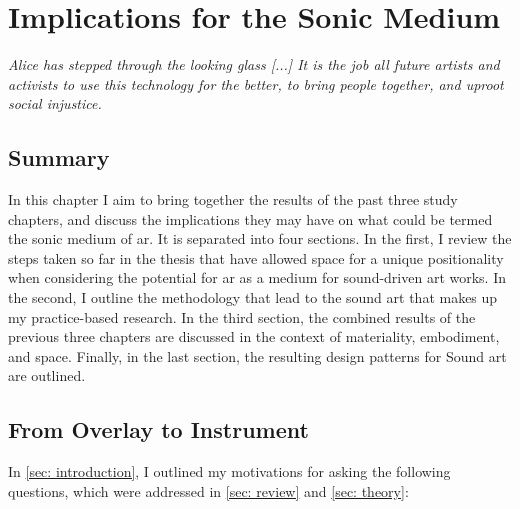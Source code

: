 \chapter{Implications for the Sonic Medium}
\label{sec: discussion}
\epigraph{\emph{Alice has stepped through the looking glass [...] It is the job all future artists and activists to use this technology for the better, to bring people together, and uproot social injustice.}}{\citep[]{skwarek2018}}


\clearpage
\section{Summary}\label{sec: discussion-summary}
In this chapter I aim to bring together the results of the past three study chapters, and discuss the implications they may have on what could be termed the sonic medium of \gls{ar}. It is separated into four sections. In the first, I review the steps taken so far in the thesis that have allowed space for a unique positionality when considering the potential for \gls{ar} as a medium for sound-driven art works. In the second, I outline the methodology that lead to the sound \gls{art} that makes up my practice-based research. In the third section, the combined results of the previous three chapters are discussed in the context of materiality, embodiment, and space. Finally, in the last section, the resulting design patterns for Sound \gls{art} are outlined.
\section{From Overlay to Instrument}\label{sec: discussion-review}
In \autoref{sec: introduction}, I outlined my motivations for asking the following questions, which were addressed in \autoref{sec: review} and \autoref{sec: theory}: 

